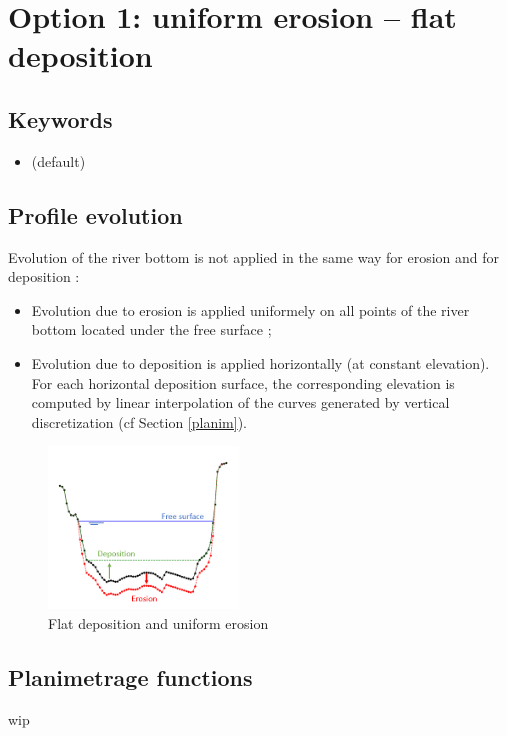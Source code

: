 \section{Option 1: uniform erosion -- flat deposition}

\subsection{Keywords}
\begin{itemize}
\item {} (default)
\end{itemize}

\subsection{Profile evolution}
Evolution of the river bottom is not applied in the same way for erosion and for deposition :
\begin{itemize}
 \item Evolution due to erosion is applied uniformely on all points of the river bottom located under the free surface ;
 \item Evolution due to deposition is applied horizontally (at constant elevation). For each horizontal deposition surface, the corresponding elevation is computed by linear interpolation of the curves generated by vertical discretization (cf Section \ref{planim}).
\end{itemize}

\begin{figure}[htb!]
    \centering
    \includegraphics[width=0.45\textwidth]{./graphics/erosion_deposition.png}
    \caption{Flat deposition and uniform erosion}
    \label{fig:depo_ero2}
\end{figure}

\subsection{Planimetrage functions}
wip

